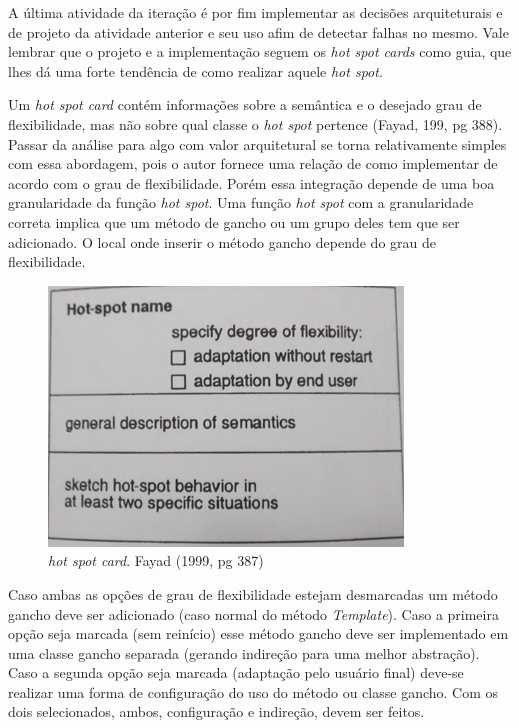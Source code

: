 A última atividade da iteração é por fim implementar as decisões arquiteturais e de projeto da atividade anterior e seu uso afim de detectar falhas no mesmo. Vale lembrar que o projeto e a implementação seguem os \textit{hot spot cards} como guia, que lhes dá uma forte tendência de como realizar aquele \textit{hot spot}.

Um \textit{hot spot card} contém informações sobre a semântica e o desejado grau de flexibilidade, mas não sobre qual classe o \textit{hot spot} pertence (Fayad, 199, pg 388). Passar da análise para algo com valor arquitetural se torna relativamente simples com essa abordagem, pois o autor fornece uma relação de como implementar de acordo com o grau de flexibilidade. Porém essa integração depende de uma boa granularidade da função \textit{hot spot}. Uma função \textit{hot spot} com a granularidade correta implica que um método de gancho ou um grupo deles tem que ser adicionado. O local onde inserir o método gancho depende do grau de flexibilidade.

\begin{figure}[h]
	\centering
	\label{fig15}
		\includegraphics[keepaspectratio=true,scale=0.4]{figuras/hotspotcard.jpg}
	\caption{\textit{hot spot card}. Fayad (1999, pg 387)}
\end{figure}

Caso ambas as opções de grau de flexibilidade estejam desmarcadas um método gancho deve ser adicionado (caso normal do método \textit{Template}). Caso a primeira opção seja marcada (sem reinício) esse método gancho deve ser implementado em uma classe gancho separada (gerando indireção para uma melhor abstração). Caso a segunda opção seja marcada (adaptação pelo usuário final) deve-se realizar uma forma de configuração do uso do método ou classe gancho. Com os dois selecionados, ambos, configuração e indireção, devem ser feitos.

